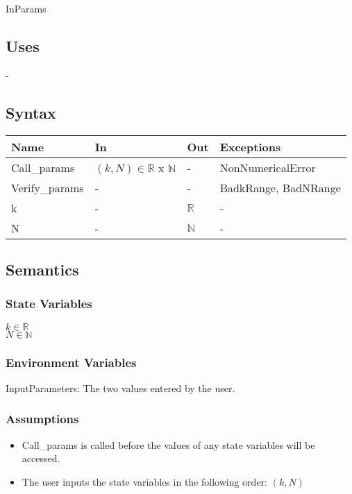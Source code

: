 \documentclass[12pt, titlepage]{article}
\begin{document}
InParams

\subsection{Uses}

-

\subsection{Syntax}

\begin{center}
\begin{tabular}{p{3cm} p{3cm} p{3cm} >{\raggedright\arraybackslash}p{7cm}}
\toprule
\textbf{Name} & \textbf{In} & \textbf{Out} & \textbf{Exceptions} \\
\hline
Call\_params & $(k,N) \in \mathbb{R}$ x $\mathbb{N}$ & - & NonNumericalError \\
Verify\_params & - & - & BadkRange, BadNRange \\
k & - & $\mathbb{R}$ & - \\
N & - & $\mathbb{N}$ & - \\
\hline
\end{tabular}
\end{center}

\subsection{Semantics}

\subsubsection{State Variables}

$k \in \mathbb{R}$ \\ 
$N \in \mathbb{N}$ 

\subsubsection{Environment Variables}

InputParameters: The two values entered by the user. 

\subsubsection{Assumptions}

\begin{itemize}
	\item Call\_params is called before the values of any state variables will 
	be accessed.
	\item The user inputs the state variables in the following order: $(k,N)$
\end{itemize}
\end{document}
